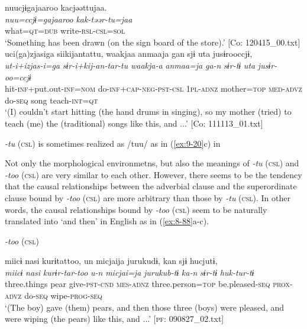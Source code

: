 \ex [= (\ref{ex:5-39}b)]

{\TM}
\glll  nuucjɨgajaaroo  kacjəəttujaa.\\
\textit{nuu=ccjɨ=gajaaroo}  \textit{kak-təər-tu=jaa}\\
what=\textsc{qt}=\textsc{dub}  write-\textsc{rsl}-\textsc{csl}=\textsc{sol}\\
\glt ‘Something has been drawn (on the sign board of the store).’ [Co: 120415\_00.txt]
\ex
{\TM}
\glll  uci(ga)zjasiga  siikijantattu,  waakjaa      anmaaja  gan  sjɨ  uta  jusɨrooccjɨ,
\\
\textit{ut-i+izjas-i=ga}  \textit{sɨr-i+kij-an-tar-tu}  \textit{waakja-a}      \textit{anmaa=ja}  \textit{ga-n}  \textit{sɨr-tɨ}  \textit{uta}  \textit{jusɨr-oo=ccjɨ}\\
hit-\textsc{inf}+put.out-\textsc{inf}=\textsc{nom}  do-\textsc{inf}+\textsc{cap}-\textsc{neg}-\textsc{pst}-\textsc{csl}  1\textsc{pl}-\textsc{adnz}   mother=\textsc{top}  \textsc{med}-\textsc{advz}  do-\textsc{seq}  song  teach-\textsc{int}=\textsc{qt}\\
\glt ‘(I) couldn’t start hitting (the hand drums in singing), so my mother (tried) to teach (me) the (traditional) songs like this, and ...’ [Co: 111113\_01.txt]
\z
\z

\textit{-tu} (\textsc{csl}) is sometimes realized as /tuu/ as in (\ref{ex:9-20}c) in 

Not only the morphological environmetns, but also the meanings of \textit{-tu} (\textsc{csl}) and \textit{-too} (\textsc{csl}) are very similar to each other. However, there seems to be the tendency that the causal relationships between the adverbial clause and the superordinate clause bound by \textit{-too} (\textsc{csl}) are more arbitrary than those by \textit{-tu} (\textsc{csl}). In other words, the causal relationships bound by \textit{-too} (\textsc{csl}) seem to be naturally translated into ‘and then’ in English as in (\ref{ex:8-88}a-c).

\ea\label{ex:8-88}
  \textit{-too} (\textsc{csl})

\ea
{\TM}
\glll  miicɨ  nasi  kurɨtattoo,  un  micjaija      jurukudɨ,  kan  sjɨ  hucjutɨ,\\
\textit{miicɨ}  \textit{nasi}  \textit{kurɨr-tar-too}  \textit{u-n}  \textit{micjai=ja}   \textit{jurukub-tɨ}  \textit{ka-n}  \textit{sɨr-tɨ}  \textit{huk-tur-tɨ}\\
three.things  pear  give-\textsc{pst}-\textsc{cnd}  \textsc{mes}-\textsc{adnz}  three.person=\textsc{top}   be.pleased-\textsc{seq}  \textsc{prox}-\textsc{advz}  do-\textsc{seq}  wipe-\textsc{prog}-\textsc{seq}\\
\glt ‘(The boy) gave (them) pears, and then those three (boys) were pleased, and were wiping (the pears) like this, and ...’ [\textsc{pf}: 090827\_02.txt]

